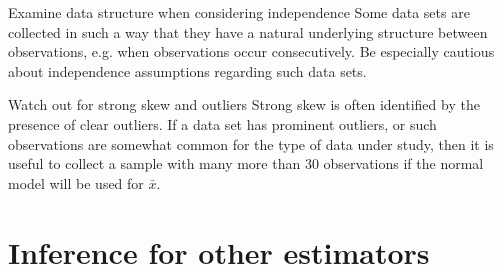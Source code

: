


\begin{caution}
{Examine data structure when considering independence}
{Some data sets are collected in such a way that they have a natural underlying structure between observations, e.g. when observations occur consecutively. Be especially cautious about independence assumptions regarding such data sets.}
\end{caution}

\begin{caution}{Watch out for strong skew and outliers}
{Strong skew is often identified by the presence of clear outliers. If a data set has prominent outliers, or such observations are somewhat common for the type of data under study, then it is useful to collect a sample with many more than 30 observations if the normal model will be used for $\bar{x}$.}
\end{caution}



\section{Inference for other estimators}
\label{aFrameworkForInference}

